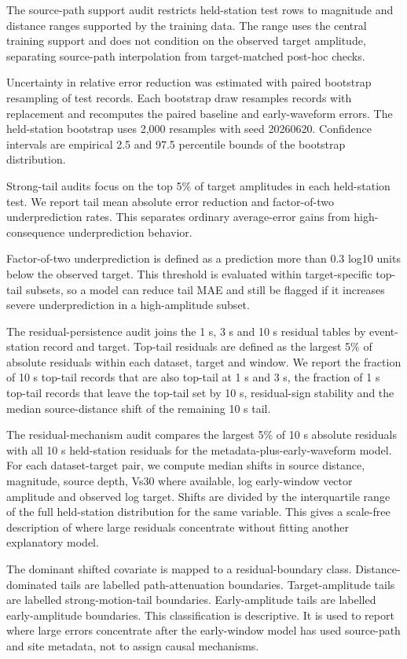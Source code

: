 \documentclass[
  10pt,
]{article}
\begin{document}
The source-path support audit restricts held-station test rows to
magnitude and distance ranges supported by the training data. The range
uses the central training support and does not condition on the observed
target amplitude, separating source-path interpolation from
target-matched post-hoc checks.

Uncertainty in relative error reduction was estimated with paired
bootstrap resampling of test records. Each bootstrap draw resamples
records with replacement and recomputes the paired baseline and
early-waveform errors. The held-station bootstrap uses 2,000 resamples
with seed 20260620. Confidence intervals are empirical 2.5 and 97.5
percentile bounds of the bootstrap distribution.

Strong-tail audits focus on the top 5\% of target amplitudes in each
held-station test. We report tail mean absolute error reduction and
factor-of-two underprediction rates. This separates ordinary
average-error gains from high-consequence underprediction behavior.

Factor-of-two underprediction is defined as a prediction more than 0.3
log10 units below the observed target. This threshold is evaluated
within target-specific top-tail subsets, so a model can reduce tail MAE
and still be flagged if it increases severe underprediction in a
high-amplitude subset.

The residual-persistence audit joins the 1 s, 3 s and 10 s residual
tables by event-station record and target. Top-tail residuals are
defined as the largest 5\% of absolute residuals within each dataset,
target and window. We report the fraction of 10 s top-tail records that
are also top-tail at 1 s and 3 s, the fraction of 1 s top-tail records
that leave the top-tail set by 10 s, residual-sign stability and the
median source-distance shift of the remaining 10 s tail.

The residual-mechanism audit compares the largest 5\% of 10 s absolute
residuals with all 10 s held-station residuals for the
metadata-plus-early-waveform model. For each dataset-target pair, we
compute median shifts in source distance, magnitude, source depth, Vs30
where available, log early-window vector amplitude and observed log
target. Shifts are divided by the interquartile range of the full
held-station distribution for the same variable. This gives a scale-free
description of where large residuals concentrate without fitting another
explanatory model.

The dominant shifted covariate is mapped to a residual-boundary class.
Distance-dominated tails are labelled path-attenuation boundaries.
Target-amplitude tails are labelled strong-motion-tail boundaries.
Early-amplitude tails are labelled early-amplitude boundaries. This
classification is descriptive. It is used to report where large errors
concentrate after the early-window model has used source-path and site
metadata, not to assign causal mechanisms.
\end{document}
